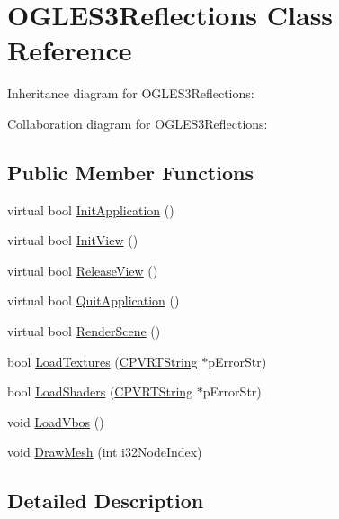 \hypertarget{class_o_g_l_e_s3_reflections}{\section{O\+G\+L\+E\+S3\+Reflections Class Reference}
\label{class_o_g_l_e_s3_reflections}
}


Inheritance diagram for O\+G\+L\+E\+S3\+Reflections\+:


Collaboration diagram for O\+G\+L\+E\+S3\+Reflections\+:
\subsection*{Public Member Functions}
\begin{DoxyCompactItemize}
\item 
virtual bool \hyperlink{class_o_g_l_e_s3_reflections_aad4f56367d558c67f8cb4df37caa1a5d}{Init\+Application} ()
\item 
virtual bool \hyperlink{class_o_g_l_e_s3_reflections_a162c3ff9b652b115bd77079fdee2509b}{Init\+View} ()
\item 
virtual bool \hyperlink{class_o_g_l_e_s3_reflections_a15c5c8d40a1b3af9e43366c6d439a909}{Release\+View} ()
\item 
virtual bool \hyperlink{class_o_g_l_e_s3_reflections_a185f55509d36aae9c1ffd30b2a26d655}{Quit\+Application} ()
\item 
virtual bool \hyperlink{class_o_g_l_e_s3_reflections_aa39e7a96e42a0dd098d0e034f660bf92}{Render\+Scene} ()
\item 
bool \hyperlink{class_o_g_l_e_s3_reflections_aacba079c691f15bb65c099b5d582a7c2}{Load\+Textures} (\hyperlink{class_c_p_v_r_t_string}{C\+P\+V\+R\+T\+String} $\ast$p\+Error\+Str)
\item 
bool \hyperlink{class_o_g_l_e_s3_reflections_af5093b9bbca59d290c10de8e968ef651}{Load\+Shaders} (\hyperlink{class_c_p_v_r_t_string}{C\+P\+V\+R\+T\+String} $\ast$p\+Error\+Str)
\item 
void \hyperlink{class_o_g_l_e_s3_reflections_aa1f9f4e88c9913f363029b063654123c}{Load\+Vbos} ()
\item 
void \hyperlink{class_o_g_l_e_s3_reflections_a50a6188f067b53ab0b86fd533343d6ef}{Draw\+Mesh} (int i32\+Node\+Index)
\end{DoxyCompactItemize}


\subsection{Detailed Description}


